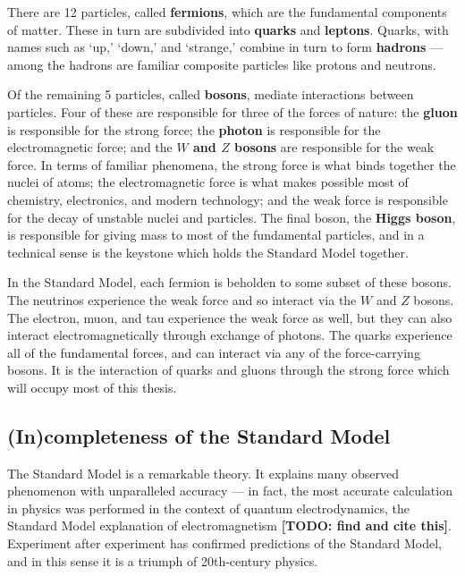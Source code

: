 \documentclass[12pt,twoside,class=../reedthesis, crop=false]{standalone}
\begin{document}
	There are 12 particles, called \textbf{fermions}, which are the fundamental components of matter. These in turn are subdivided into \textbf{quarks} and \textbf{leptons}. Quarks, with names such as `up,' `down,' and `strange,' combine in turn to form \textbf{hadrons} --- among the hadrons are familiar composite particles like protons and neutrons. 

	Of the remaining 5 particles, called \textbf{bosons}, mediate interactions between particles. Four of these are responsible for three of the forces of nature: the \textbf{gluon} is responsible for the strong force; the \textbf{photon} is responsible for the electromagnetic force; and the \textbf{$W$ and $Z$ bosons} are responsible for the weak force. In terms of familiar phenomena, the strong force is what binds together the nuclei of atoms; the electromagnetic force is what makes possible most of chemistry, electronics, and modern technology; and the weak force is responsible for the decay of unstable nuclei and particles. The final boson, the \textbf{Higgs boson}, is responsible for giving mass to most of the fundamental particles, and in a technical sense is the keystone which holds the Standard Model together.

	In the Standard Model, each fermion is beholden to some subset of these bosons. The neutrinos experience the weak force and so interact via the $W$ and $Z$ bosons. The electron, muon, and tau experience the weak force as well, but they can also interact electromagnetically through exchange of photons. The quarks experience all of the fundamental forces, and can interact via any of the force-carrying bosons. It is the interaction of quarks and gluons through the strong force which will occupy most of this thesis.


\subsection{(In)completeness of the Standard Model}
	The Standard Model is a remarkable theory. It explains many observed phenomenon with unparalleled accuracy --- in fact, the most accurate calculation in physics was performed in the context of quantum electrodynamics, the Standard Model explanation of electromagnetism \cite{larkoski_elementary_2019-1} {\color{red}\textbf{[TODO: find and cite this]}}. Experiment after experiment has confirmed predictions of the Standard Model, and in this sense it is a triumph of 20th-century physics.
\end{document}
